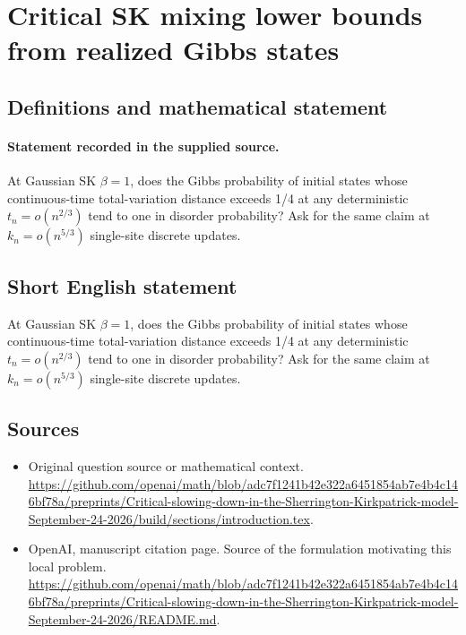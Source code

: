 \documentclass[11pt]{article}
\begin{document}
\section*{Critical SK mixing lower bounds from realized Gibbs states}\label{30007389}
\subsection{Definitions and mathematical statement}
\paragraph{Statement recorded in the supplied source.}
At Gaussian SK $\beta =1$, does the Gibbs probability of initial states whose continuous-time total-variation distance exceeds 1/4 at any deterministic $t_n=o(n^{2/3})$ tend to one in disorder probability? Ask for the same claim at $k_n=o(n^{5/3})$ single-site discrete updates.
\subsection{Short English statement}
At Gaussian SK $\beta =1$, does the Gibbs probability of initial states whose continuous-time total-variation distance exceeds 1/4 at any deterministic $t_n=o(n^{2/3})$ tend to one in disorder probability? Ask for the same claim at $k_n=o(n^{5/3})$ single-site discrete updates.
\subsection{Sources}
\begin{itemize}
\item[S1] Original question source or mathematical context.
\url{https://github.com/openai/math/blob/adc7f1241b42e322a6451854ab7e4b4c146bf78a/preprints/Critical-slowing-down-in-the-Sherrington-Kirkpatrick-model-September-24-2026/build/sections/introduction.tex}.
\item[S2] OpenAI, manuscript citation page. Source of the formulation motivating this local problem.
\url{https://github.com/openai/math/blob/adc7f1241b42e322a6451854ab7e4b4c146bf78a/preprints/Critical-slowing-down-in-the-Sherrington-Kirkpatrick-model-September-24-2026/README.md}.
\end{itemize}
\end{document}
